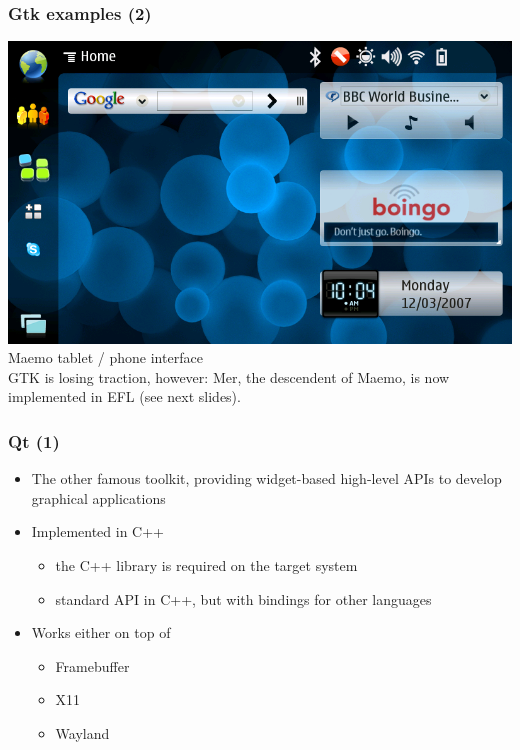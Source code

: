 \begin{frame}
  \frametitle{Gtk examples (2)}
    \includegraphics[height=0.6\textheight]{slides/sysdev-embedded-linux/maemo-gui.png}\\
    Maemo tablet / phone interface\\
    GTK is losing traction, however:
    Mer, the descendent of Maemo, is now implemented in EFL (see next
    slides).\\
\end{frame}

\begin{frame}
  \frametitle{Qt (1)}
  \begin{itemize}
  \item The other famous toolkit, providing widget-based high-level APIs to
    develop graphical applications
  \item Implemented in C++
    \begin{itemize}
    \item the C++ library is required on the target system
    \item standard API in C++, but with bindings for other languages
    \end{itemize}
  \item Works either on top of
    \begin{itemize}
    \item Framebuffer
    \item X11
    \item Wayland
    \end{itemize}
  \end{itemize}
\end{frame}

